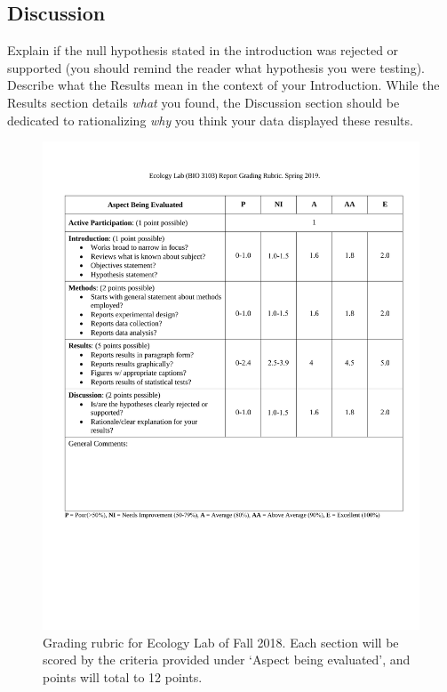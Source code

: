 \documentclass[11pt,]{article}
\makeatletter
\def\maxwidth{\ifdim\Gin@nat@width>\linewidth\linewidth
\else\Gin@nat@width\fi}
\let\Oldincludegraphics\includegraphics
\renewcommand{\includegraphics}[1]{\Oldincludegraphics[width=\maxwidth]{#1}}
\makeatother
\begin{document}
\hypertarget{discussion}{%
\subsection{Discussion}\label{discussion}}

Explain if the null hypothesis stated in the introduction was rejected
or supported (you should remind the reader what hypothesis you were
testing). Describe what the Results mean in the context of your
Introduction. While the Results section details \emph{what} you found,
the Discussion section should be dedicated to rationalizing \emph{why}
you think your data displayed these results.

\newpage

\begin{figure}
\centering
\includegraphics{Grading_rubric.pdf}
\caption{Grading rubric for Ecology Lab of Fall 2018. Each section will
be scored by the criteria provided under `Aspect being evaluated', and
points will total to 12 points.}
\end{figure}
\end{document}
